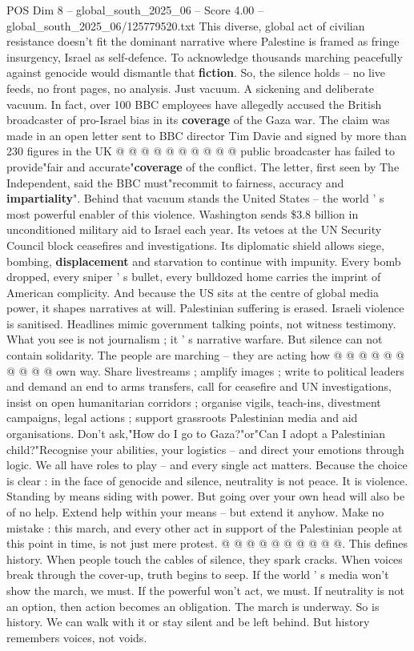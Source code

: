 \begin{textsample}{POS Dim 8 – global\_south\_2025\_06 – Score 4.00 – global\_south\_2025\_06/125779520.txt}
This diverse, global act of civilian resistance doesn't fit the dominant narrative where Palestine is framed as fringe insurgency, Israel as self-defence.
To acknowledge thousands marching peacefully against genocide would dismantle that \textbf{fiction}.
So, the silence holds -- no live feeds, no front pages, no analysis.
Just vacuum.
A sickening and deliberate vacuum.
In fact, over 100 BBC employees have allegedly accused the British broadcaster of pro-Israel bias in its \textbf{coverage} of the Gaza war.
The claim was made in an open letter sent to BBC director Tim Davie and signed by more than 230 figures in the UK @ @ @ @ @ @ @ @ @ @ public broadcaster has failed to provide"fair and accurate"\textbf{coverage} of the conflict.
The letter, first seen by The Independent, said the BBC must"recommit to fairness, accuracy and \textbf{impartiality}".
Behind that vacuum stands the United States -- the world ' s most powerful enabler of this violence.
Washington sends \$3.8 billion in unconditioned military aid to Israel each year.
Its vetoes at the UN Security Council block ceasefires and investigations.
Its diplomatic shield allows siege, bombing, \textbf{displacement} and starvation to continue with impunity.
Every bomb dropped, every sniper ' s bullet, every bulldozed home carries the imprint of American complicity.
And because the US sits at the centre of global media power, it shapes narratives at will.
Palestinian suffering is erased.
Israeli violence is sanitised.
Headlines mimic government talking points, not witness testimony.
What you see is not journalism ; it ' s narrative warfare.
But silence can not contain solidarity.
The people are marching -- they are acting how @ @ @ @ @ @ @ @ @ @ own way.
Share livestreams ; amplify images ; write to political leaders and demand an end to arms transfers, call for ceasefire and UN investigations, insist on open humanitarian corridors ; organise vigils, teach-ins, divestment campaigns, legal actions ; support grassroots Palestinian media and aid organisations.
Don't ask,"How do I go to Gaza?"or"Can I adopt a Palestinian child?"Recognise your abilities, your logistics -- and direct your emotions through logic.
We all have roles to play -- and every single act matters.
Because the choice is clear : in the face of genocide and silence, neutrality is not peace.
It is violence.
Standing by means siding with power.
But going over your own head will also be of no help.
Extend help within your means -- but extend it anyhow.
Make no mistake : this march, and every other act in support of the Palestinian people at this point in time, is not just mere protest. @ @ @ @ @ @ @ @ @ @.
This defines history.
When people touch the cables of silence, they spark cracks.
When voices break through the cover-up, truth begins to seep.
If the world ' s media won't show the march, we must.
If the powerful won't act, we must.
If neutrality is not an option, then action becomes an obligation.
The march is underway.
So is history.
We can walk with it or stay silent and be left behind.
But history remembers voices, not voids.

\end{textsample}

